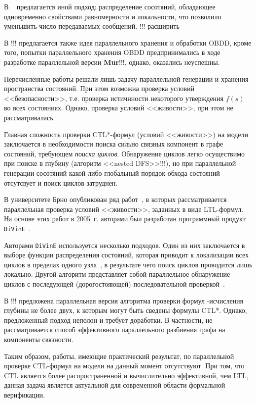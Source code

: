 \documentclass[a4paper,notitlepage,14pt]{article}
\begin{document}
В ~\cite{LS99} предлагается иной подход: распределение сосотяний, обладающее одновременно
свойствами равномерности и локальности, что позволило уменьшить число передаваемых
сообщений.
!!! расширить

В !!! предлагается также идея параллельного хранения и обработки OBDD, кроме того, попытки
параллельного хранения OBDD предпринимались в ходе разработке параллельной версии
\textbf{Mur\phi}!!!, однако, оказались неуспешны.

Перечисленные работы решали лишь задачу параллельной генерации и хранения пространства
состояний. При этом возможна проверка условий <<безопасности>>, т.е. проверка истичнности
некоторого утверждения $f(s)$ во всех состояниях. Однако, проверка условий <<живости>>,
при этом не рассматривалась.

Главная сложность проверки CTL*-формул (условий <<живости>>) на модели заключается в
необходимости поиска сильно связных компонент в графе состояний, требующем \emph{поиска
  циклов}. Обнаружение циклов легко осуществимо при поиске в глубину (алгоритм <<nested
DFS>>!!!), но при параллельной генерации сосотяний какой-либо глобальный порядок обхода
состояний отсутсвует и поиск циклов затруднен.

В университете Брно опубликован ряд работ~\cite{DLTL1,DLTL2}, в которых рассматривается
параллельная проверка условий <<живости>>, заданных в виде LTL-формул. На основе этих
работ в 2005~г. авторами был разработан программный продукт \texttt{DiVinE}~\cite{DiVinE}.

Авторами \texttt{DiVinE} используется несколько подходов. Один из них заключается в выборе
функции распределения состояний, которая приводит к локализации всех циклов в пределах
одного узла~\cite{DLTL1}, в результате чего поиск циклов проводится лишь локально. Другой
алгоритм представляет собой параллельное обнаружение циклов с последующей (дорогостояющей)
последовательной проверкой~\cite{DLTL2}.

В !!! предложена параллельная версия алгоритма проверки формул \mu-исчисления глубины не
более двух, к которым могут быть сведены формулы CTL*. Однако, предложенный подход
неполон и требует доработки. В частности, не рассматривается способ эффективного
параллельного разбиения графа на компоненты связности.

Таким образом, работы, имеющие практический результат, по параллельной проверке CTL-формул
на модели на данный момент отсутствуют. При том, что CTL является более распространенной и
вычислительно эффективной, чем LTL, данная задача является актуальной для современной
области формальной верификации.
\end{document}
